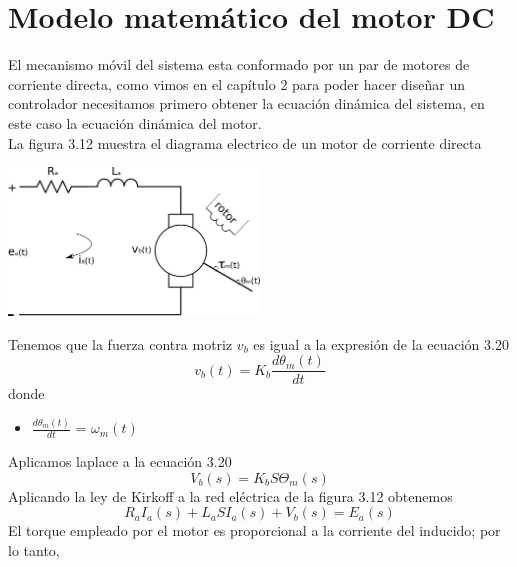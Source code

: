 \section{Modelo matemático del motor DC}
El mecanismo móvil del sistema esta conformado por un par de motores de corriente directa, como vimos
en el capítulo 2 para poder hacer diseñar un controlador necesitamos primero obtener la ecuación dinámica
del sistema, en este caso la ecuación dinámica del motor.\\
La figura 3.12 muestra el diagrama electrico de un motor de corriente directa
\begin{center}
	\includegraphics[width=0.5\textwidth]{Contenido/Cuerpo/Capitulo3/Fig16.eps}
	\label{fig:ModeloMat:Fig1}
\end{center}
Tenemos que la fuerza contra motriz $v_b$ es igual a la expresión de la ecuación 3.20
\begin{equation}
	v_b(t) =K_b \frac{d\theta_m(t)}{dt}
\end{equation}
donde
\begin{itemize}
	\item $ \frac{d\theta_m(t)}{dt} $ = $ \omega_m(t) $
\end{itemize}
Aplicamos laplace a la ecuación 3.20
\begin{equation}
	V_b(s) = K_bS\Theta_m(s)
\end{equation}
Aplicando la ley de Kirkoff a la red eléctrica de la figura 3.12 obtenemos
\begin{equation}
	R_aI_a(s) + L_aSI_a(s) + V_b(s) = E_a(s)
\end{equation}
El torque empleado por el motor es proporcional a la corriente del inducido; por lo tanto,
